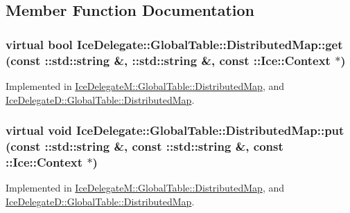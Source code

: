 \subsection{Member Function Documentation}
\hypertarget{class_ice_delegate_1_1_global_table_1_1_distributed_map_a024ac1e825e6c918e191bcf737b0a190}{
\subsubsection[{get}]{\setlength{\rightskip}{0pt plus 5cm}virtual bool IceDelegate::GlobalTable::DistributedMap::get (const ::std::string \&, \/  ::std::string \&, \/  const ::Ice::Context $\ast$)}}
\label{class_ice_delegate_1_1_global_table_1_1_distributed_map_a024ac1e825e6c918e191bcf737b0a190}


Implemented in \hyperlink{class_ice_delegate_m_1_1_global_table_1_1_distributed_map_a1b87848a88f6d10e865f13398512daf7}{IceDelegateM::GlobalTable::DistributedMap}, and \hyperlink{class_ice_delegate_d_1_1_global_table_1_1_distributed_map_a2c00fdcff0ef06199ba8f881b6892cbd}{IceDelegateD::GlobalTable::DistributedMap}.

\hypertarget{class_ice_delegate_1_1_global_table_1_1_distributed_map_a145c6fd07b6d19f68f28414f0ae972f5}{
\subsubsection[{put}]{\setlength{\rightskip}{0pt plus 5cm}virtual void IceDelegate::GlobalTable::DistributedMap::put (const ::std::string \&, \/  const ::std::string \&, \/  const ::Ice::Context $\ast$)}}
\label{class_ice_delegate_1_1_global_table_1_1_distributed_map_a145c6fd07b6d19f68f28414f0ae972f5}


Implemented in \hyperlink{class_ice_delegate_m_1_1_global_table_1_1_distributed_map_ab20480bb054ed00e52cbfd2e7d0d5439}{IceDelegateM::GlobalTable::DistributedMap}, and \hyperlink{class_ice_delegate_d_1_1_global_table_1_1_distributed_map_afd949ed4d3a1bfa7e2313ae3379f6ac3}{IceDelegateD::GlobalTable::DistributedMap}.

